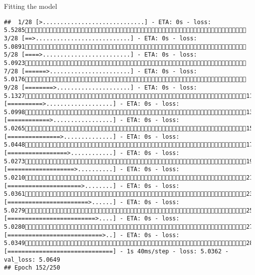 \documentclass[
  ignorenonframetext,
]{beamer}
\begin{document}
\begin{frame}[fragile]{Fitting the model}
\begin{verbatim}
##  1/28 [>.............................] - ETA: 0s - loss: 5.5285 3/28 [==>...........................] - ETA: 0s - loss: 5.0891 5/28 [====>.........................] - ETA: 0s - loss: 5.0923 7/28 [======>.......................] - ETA: 0s - loss: 5.0176 9/28 [========>.....................] - ETA: 0s - loss: 5.132711/28 [==========>...................] - ETA: 0s - loss: 5.099813/28 [============>.................] - ETA: 0s - loss: 5.026515/28 [===============>..............] - ETA: 0s - loss: 5.044817/28 [=================>............] - ETA: 0s - loss: 5.027319/28 [===================>..........] - ETA: 0s - loss: 5.021021/28 [=====================>........] - ETA: 0s - loss: 5.036123/28 [=======================>......] - ETA: 0s - loss: 5.027925/28 [=========================>....] - ETA: 0s - loss: 5.028027/28 [===========================>..] - ETA: 0s - loss: 5.034928/28 [==============================] - 1s 40ms/step - loss: 5.0362 - val_loss: 5.0649
## Epoch 152/250

\end{verbatim}
\end{frame}
\end{document}
